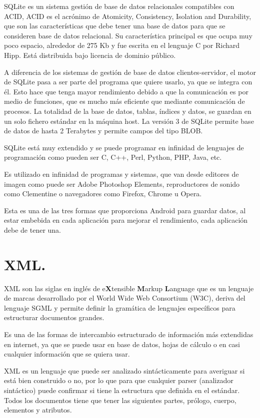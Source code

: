 SQLite es un sistema gestión de base de datos relacionales compatibles con ACID, ACID es el acrónimo de Atomicity, Consistency, Isolation and Durability, que son las características que debe tener una base de datos para que se consideren base de datos relacional. Su característica principal es que ocupa muy poco espacio, alrededor de 275 Kb y fue escrita en el lenguaje C por Richard Hipp. Está distribuida bajo licencia de dominio público.

A diferencia de los sistemas de gestión de base de datos clientes-servidor, el motor de SQLite pasa a ser parte del programa que quiere usarlo, ya que se integra con él. Esto hace que tenga mayor rendimiento debido a que la comunicación es por medio de funciones, que es mucho más eficiente que mediante comunicación de procesos. La totalidad de la base de datos, tablas, índices y datos, se guardan en un solo fichero estándar en la máquina host. La versión 3 de SQLite permite base de datos de hasta 2 Terabytes y permite campos del tipo BLOB.

SQLite está muy extendido y se puede programar en infinidad de lenguajes de programación como pueden ser C, C++, Perl, Python, PHP, Java, etc.

Es utilizado en infinidad de programas y sistemas, que van desde editores de imagen como puede ser Adobe Photoshop Elements, reproductores de sonido como Clementine o navegadores como Firefox, Chrome u Opera.

Esta es una de las tres formas que proporciona Android para guardar datos, al estar embebida en cada aplicación para mejorar el rendimiento, cada aplicación debe de tener una. 

\section{XML.}

XML son las siglas en inglés de e\textbf{X}tensible \textbf{M}arkup \textbf{L}anguage que es un lenguaje de marcas desarrollado por el World Wide Web Consortium (W3C), deriva del lenguaje SGML y permite definir la gramática de lenguajes específicos para estructurar documentos grandes.

Es una de las formas de intercambio estructurado de información más extendidas en internet, ya que se puede usar en base de datos, hojas de cálculo o en casi cualquier información que se quiera usar.

XML es un lenguaje que puede ser analizado sintácticamente para averiguar si está bien construido o no, por lo que para que cualquier parser (analizador sintáctico) puede confirmar si tiene la estructura que definida en el estándar. Todos los documentos tiene que tener las siguientes partes, prólogo, cuerpo, elementos y atributos.

